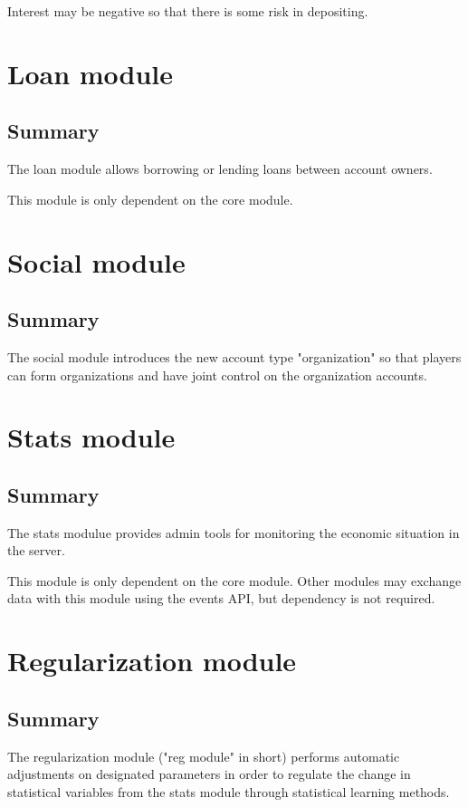 \documentclass{report}
\begin{document}
				Interest may be negative so that there is some risk in depositing.

	\part{Loan module}
		\chapter{Summary}

			The loan module allows borrowing or lending loans between account owners.

			This module is only dependent on the core module.

	\part{Social module}
		\chapter{Summary}

			The social module introduces the new account type "organization" so that players can form organizations
			and have joint control on the organization accounts.

	\part{Stats module}
		\chapter{Summary}

			The stats modulue provides admin tools for monitoring the economic situation in the server.

			This module is only dependent on the core module.
			Other modules may exchange data with this module using the events API,
			but dependency is not required.

	\part{Regularization module}
		\chapter{Summary}

			The regularization module ("reg module" in short) performs automatic adjustments on designated parameters
			in order to regulate the change in statistical variables from the stats module through statistical learning methods.
\end{document}
